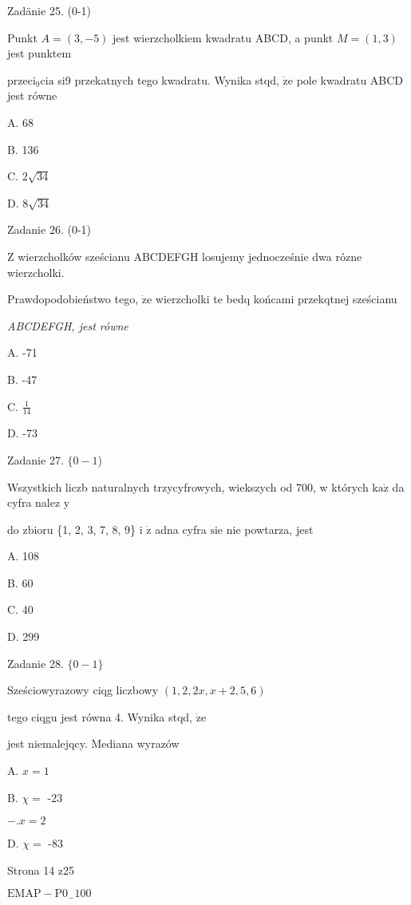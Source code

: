 \documentclass[a4paper,12pt]{article}
\begin{document}
Zadänie 25. (0-1)

Punkt $A=(3,-5)$ jest wierzcholkiem kwadratu ABCD, a punkt $M=(1,3)$ jest punktem

$\mathrm{p}\mathrm{r}\mathrm{z}\mathrm{e}\mathrm{c}\mathrm{i}_{9}\mathrm{c}\mathrm{i}\mathrm{a}$ si9 przekatnych tego kwadratu. Wynika stqd, $\dot{\mathrm{z}}\mathrm{e}$ pole kwadratu ABCD jest równe

A. 68

B. 136

C. $2\sqrt{34}$

D. $8\sqrt{34}$

Zadanie 26. (0-1)

$\mathrm{Z}$ wierzcholków sześcianu ABCDEFGH losujemy jednocześnie dwa rózne wierzcholki.

Prawdopodobieństwo tego, $\dot{\mathrm{z}}\mathrm{e}$ wierzcholki te bedq końcami przekqtnej sześcianu

{\it ABCDEFGH, jest równe}

A. -71

B. -47

C. $\displaystyle \frac{1}{14}$

D. -73

Zadanie 27. $\{0-1$)

Wszystkich liczb naturalnych trzycyfrowych, wiekszych od 700, w których $\mathrm{k}\mathrm{a}\dot{\mathrm{z}}$ da cyfra nalez $\mathrm{y}$

do zbioru \{1, 2, 3, 7, 8, 9\} i $\dot{\mathrm{z}}$ adna cyfra $\mathrm{s}\mathrm{i}\mathrm{e}$ nie powtarza, jest

A. 108

B. 60

C. 40

D. 299

Zadanie 28. $\{0-1\}$

Sześciowyrazowy ciqg liczbowy $(1,2,2x,x+2,5,6)$

tego ciqgu jest równa 4. Wynika stqd, $\dot{\mathrm{z}}\mathrm{e}$

jest niemalejqcy. Mediana wyrazów

A. $x=1$

B. $\chi=$ -23

$-. x=2$

D. $\chi=$ -83

Strona 14 z25

$\mathrm{E}\mathrm{M}\mathrm{A}\mathrm{P}-\mathrm{P}0_{-}100$
\end{document}
